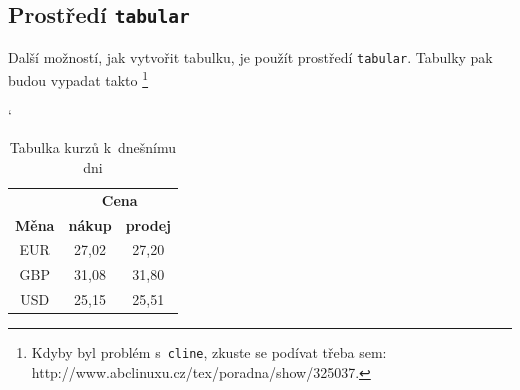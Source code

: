 \documentclass[a4paper,11pt]{article}
\begin{document}
\subsection{Prostředí \texttt{tabular}}
Další možností, jak vytvořit tabulku, je použít prostředí \texttt{tabular}. Tabulky pak budou vypadat takto \footnote{Kdyby byl problém s~\texttt{cline}, zkuste se podívat třeba sem: http://www.abclinuxu.cz/tex/poradna/show/325037.}
\bigskip
\begin{table}[h]
\begin{center}
\catcode` 
\begin{tabular}{|c|c|c|}
\hline
  & \multicolumn{2}{|c|}{\textbf{Cena}} \\ \cline{2-3}
  \textbf{Měna}& \textbf{nákup} & \textbf{prodej} \\ \hline
  EUR & 27,02 & 27,20 \\
  GBP & 31,08 & 31,80 \\
  USD & 25,15 & 25,51 \\
\hline
\end{tabular}
\caption{Tabulka kurzů k~dnešnímu dni}
\label{tab-kurz}
\end{center}
\end{table}
\bigskip
\end{document}
